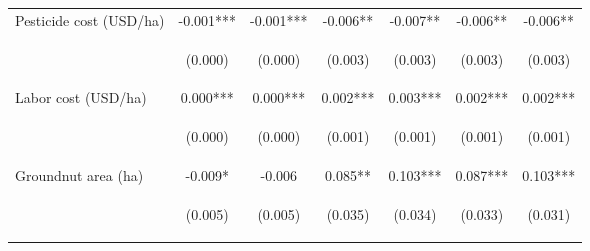 \begin{center}
\begin{tabular}{lcccccc}
Pesticide cost (USD/ha) & -0.001*** & -0.001*** & -0.006** & -0.007** & -0.006** & -0.006** \\
\vspace{4pt} & \begin{footnotesize}(0.000)\end{footnotesize} & \begin{footnotesize}(0.000)\end{footnotesize} & \begin{footnotesize}(0.003)\end{footnotesize} & \begin{footnotesize}(0.003)\end{footnotesize} & \begin{footnotesize}(0.003)\end{footnotesize} & \begin{footnotesize}(0.003)\end{footnotesize} \\
Labor cost (USD/ha) & 0.000*** & 0.000*** & 0.002*** & 0.003*** & 0.002*** & 0.002*** \\
\vspace{4pt} & \begin{footnotesize}(0.000)\end{footnotesize} & \begin{footnotesize}(0.000)\end{footnotesize} & \begin{footnotesize}(0.001)\end{footnotesize} & \begin{footnotesize}(0.001)\end{footnotesize} & \begin{footnotesize}(0.001)\end{footnotesize} & \begin{footnotesize}(0.001)\end{footnotesize} \\
Groundnut area (ha) & -0.009* & -0.006 & 0.085** & 0.103*** & 0.087*** & 0.103*** \\
\vspace{4pt} & \begin{footnotesize}(0.005)\end{footnotesize} & \begin{footnotesize}(0.005)\end{footnotesize} & \begin{footnotesize}(0.035)\end{footnotesize} & \begin{footnotesize}(0.034)\end{footnotesize} & \begin{footnotesize}(0.033)\end{footnotesize} & \begin{footnotesize}(0.031)\end{footnotesize} \\

\end{tabular}
\end{center}
